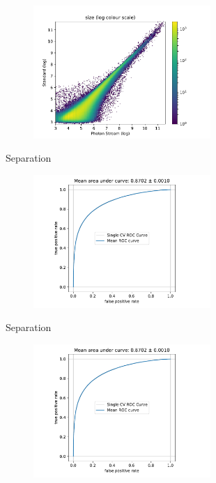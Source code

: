 \begin{frame}[t]{}

\end{frame}

\begin{frame}[t]
    \begin{figure}
        \centering
        \includegraphics[width=0.6\textwidth]{fig/size_compare.pdf}
    \end{figure}
\end{frame}

\begin{frame}[t]{Separation}
    \begin{figure}
        \centering
        \includegraphics[width=0.6\textwidth,page=2]{fig/separation_performance.pdf}
    \end{figure}
\end{frame}

\begin{frame}[t]{Separation}
    \begin{figure}
        \centering
        \includegraphics[width=0.6\textwidth,page=3]{fig/separation_performance.pdf}
    \end{figure}
\end{frame}

